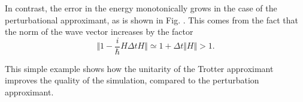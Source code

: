 In contrast, the error in the energy monotonically grows in the case of the perturbational approximant, as is shown in Fig. . This comes from the fact that the norm of the wave vector increases by the factor
\begin{equation}
\Vert 1 - \frac{i}{\hbar} H \Delta t H \Vert \simeq 1 + \Delta t \Vert H \Vert > 1.
\end{equation}

This simple example shows how the unitarity of the Trotter approximant improves the quality of the simulation, compared to the perturbation approximant.